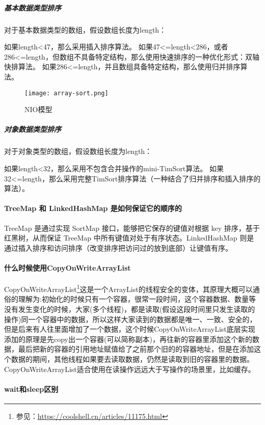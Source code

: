\documentclass[../../../interview-questions.tex]{subfiles}
\begin{document}
\subparagraph{基本数据类型排序}

对于基本数据类型的数组，假设数组长度为length：


如果length<47，那么采用插入排序算法。
如果47<=length<286，或者286<=length，但数组不具备特定结构，那么使用快速排序的一种优化形式：双轴快排算法。
如果286<=length，并且数组具备特定结构，那么使用归并排序算法。

\begin{figure}[htbp]
	\centering
	\texttt{[image: array-sort.png]}
	\caption{NIO模型}
	\label{fig:arraysort}
\end{figure}

\subparagraph{对象数据类型排序}


对于对象类型的数组，假设数组长度为length：

如果length<32，那么采用不包含合并操作的mini-TimSort算法。
如果32<=length，那么采用完整TimSort排序算法（一种结合了归并排序和插入排序的算法）。

\paragraph{TreeMap 和 LinkedHashMap 是如何保证它的顺序的}

TreeMap 是通过实现 SortMap 接口，能够把它保存的键值对根据 key 排序，基于红黑树，从而保证 TreeMap 中所有键值对处于有序状态。LinkedHashMap 则是通过插入排序和访问排序（改变排序把访问过的放到底部）让键值有序。

\paragraph{什么时候使用CopyOnWriteArrayList}

CopyOnWriteArrayList\footnote{参见：\url{https://coolshell.cn/articles/11175.html}}这是一个ArrayList的线程安全的变体，其原理大概可以通俗的理解为:初始化的时候只有一个容器，很常一段时间，这个容器数据、数量等没有发生变化的时候，大家(多个线程)，都是读取(假设这段时间里只发生读取的操作)同一个容器中的数据，所以这样大家读到的数据都是唯一、一致、安全的，但是后来有人往里面增加了一个数据，这个时候CopyOnWriteArrayList底层实现添加的原理是先copy出一个容器(可以简称副本)，再往新的容器里添加这个新的数据，最后把新的容器的引用地址赋值给了之前那个旧的的容器地址，但是在添加这个数据的期间，其他线程如果要去读取数据，仍然是读取到旧的容器里的数据。CopyOnWriteArrayList适合使用在读操作远远大于写操作的场景里，比如缓存。

\paragraph{wait和sleep区别}
\end{document}
